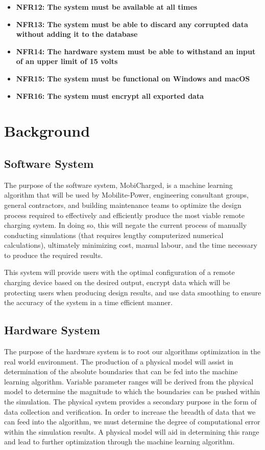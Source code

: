 \documentclass[12pt, titlepage]{article}
\begin{document}
\begin{center}
\begin{itemize}
        \item \textbf{NFR12: The system must be available at all times}
        \item \textbf{NFR13: The system must be able to discard any corrupted data without adding it to the database}
        \item \textbf{NFR14: The hardware system must be able to withstand an input of an upper limit of 15 volts}
        \item \textbf{NFR15: The system must be functional on Windows and macOS}
        \item \textbf{NFR16: The system must encrypt all exported data}
    \end{itemize}
\end{center}

\section{Background}
\subsection{Software System}
The purpose of the software system, MobiCharged, is a machine learning algorithm that will be used by Mobilite-Power, engineering consultant groups, general contractors, and building maintenance teams to optimize the design process required to effectively and efficiently produce the most viable remote charging system. In doing so, this will negate the current process of manually conducting simulations (that requires lengthy computerized numerical calculations), ultimately minimizing cost, manual labour, and the time necessary to produce the required results.
\par
This system will provide users with the optimal configuration of a remote charging device based on the desired output, encrypt data which will be protecting users when producing design results, and use data smoothing to ensure the accuracy of the system in a time efficient manner.

\subsection{Hardware System}
The purpose of the hardware system is to root our algorithms optimization in the real world environment. The production of a physical model will assist in determination of the absolute boundaries that can be fed into the machine learning algorithm. Variable parameter ranges will be derived from the physical model to determine the magnitude to which the boundaries can be pushed within the simulation. The physical system provides a secondary purpose in the form of data collection and verification. In order to increase the breadth of data that we can feed into the algorithm, we must determine the degree of computational error within the simulation results. A physical model will aid in determining this range and lead to further optimization through the machine learning algorithm.
\end{document}
